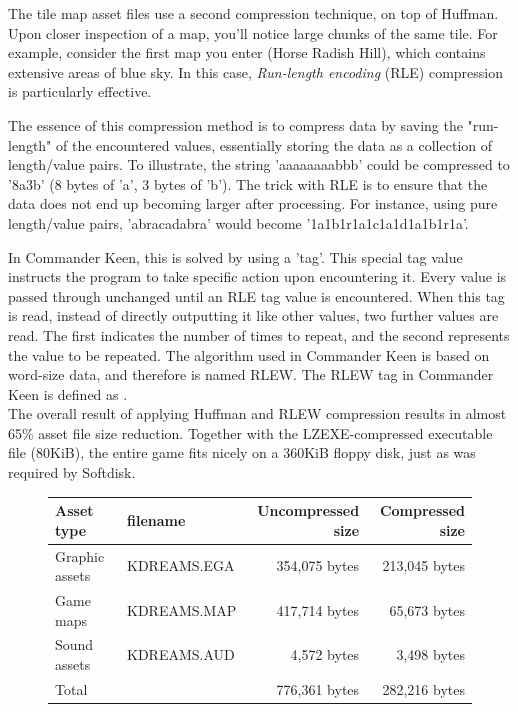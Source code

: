 \documentclass[book.tex]{subfiles}
\begin{document}
\par
The tile map asset files use a second compression technique, on top of Huffman. Upon closer inspection of a map, you'll notice large chunks of the same tile. For example, consider the first map you enter (Horse Radish Hill), which contains extensive areas of blue sky. In this case, \textit{Run-length encoding} (RLE) compression is particularly effective.\\

\par
The essence of this compression method is to compress data by saving the "run-length" of the encountered values, essentially storing the data as a collection of length/value pairs. To illustrate, the string 'aaaaaaaabbb' could be compressed to '8a3b' (8 bytes of 'a', 3 bytes of 'b'). The trick with RLE is to ensure that the data does not end up becoming larger after processing. For instance, using pure length/value pairs, 'abracadabra' would become '1a1b1r1a1c1a1d1a1b1r1a'.\\

\par
In Commander Keen, this is solved by using a 'tag'. This special tag value instructs the program to take specific action upon encountering it. Every value is passed through unchanged until an RLE tag value is encountered. When this tag is read, instead of directly outputting it like other values, two further values are read. The first indicates the number of times to repeat, and the second represents the value to be repeated. The algorithm used in Commander Keen is based on word-size data, and therefore is named RLEW. The RLEW tag in Commander Keen is defined as .\\

The overall result of applying Huffman and RLEW compression results in almost 65\% asset file size reduction. Together with the LZEXE-compressed executable file (80KiB), the entire game fits nicely on a 360KiB floppy disk, just as was required by Softdisk.\\

\begin{figure}[H]
\centering
{\renewcommand{\arraystretch}{1.2} %
\begin{tabularx}{\textwidth}{X X r r }
  \hline
  \textbf{Asset type} & \textbf{filename} & \textbf{Uncompressed size\protect\footnotemark} & \textbf{Compressed size}\\ \hline
  Graphic assets & KDREAMS.EGA & 354,075 bytes & 213,045 bytes \\
  Game maps & KDREAMS.MAP & 417,714 bytes & 65,673 bytes\\ 
  Sound assets & KDREAMS.AUD & 4,572 bytes & 3,498 bytes\\ \hline
  Total &  & 776,361 bytes & 282,216 bytes\\ \hline
\end{tabularx}
}
\end{figure}

\addtocounter{footnote}{-1}
\end{document}
